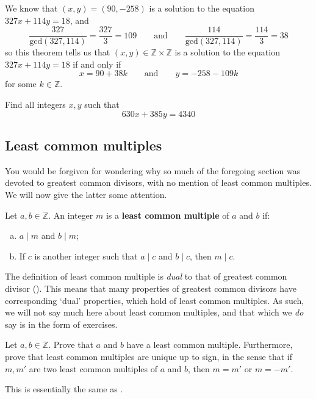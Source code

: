 \begin{example}
We know that $(x,y) = (90,{-258})$ is a solution to the equation $327x+114y=18$, and
\[ \displaystyle \frac{327}{\mathrm{gcd}(327,114)} = \frac{327}{3} = 109 \qquad \text{and} \qquad \displaystyle \frac{114}{\mathrm{gcd}(327,114)} = \frac{114}{3} = 38 \]
so this theorem tells us that $(x,y) \in \mathbb{Z} \times \mathbb{Z}$ is a solution to the equation $327x+114y=18$ if and only if
\[ x = 90 + 38k \qquad \text{and} \qquad y = -258-109k \]
for some $k \in \mathbb{Z}$.
\end{example}

\begin{exercise}
Find all integers $x,y$ such that
\[ 630x + 385y = 4340 \]
\end{exercise}

\subsection*{Least common multiples}

You would be forgiven for wondering why so much of the foregoing section was devoted to greatest common divisors, with no mention of least common multiples. We will now give the latter some attention.

\begin{definition}
\label{defLCM}
Let $a, b \in \mathbb{Z}$. An integer $m$ is a \textbf{least common multiple} of $a$ and $b$ if:
\begin{enumerate}[(a)]
\item $a \mid m$ and $b \mid m$;
\item If $c$ is another integer such that $a \mid c$ and $b \mid c$, then $m \mid c$.
\end{enumerate}
\end{definition}

The definition of least common multiple is \textit{dual} to that of greatest common divisor (). This means that many properties of greatest common divisors have corresponding `dual' properties, which hold of least common multiples. As such, we will not say much here about least common multiples, and that which we \textit{do} say is in the form of exercises.

\begin{exercise}
\label{exLCMExistsUnique}
Let $a,b \in \mathbb{Z}$. Prove that $a$ and $b$ have a least common multiple. Furthermore, prove that least common multiples are unique up to sign, in the sense that if $m,m'$ are two least common multiples of $a$ and $b$, then $m=m'$ or $m=-m'$.
\begin{backhint}
This is essentially the same as .
\end{backhint}
\end{exercise}

